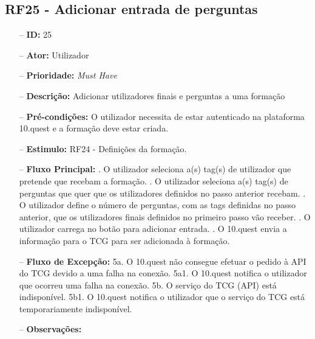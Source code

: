 \subsection{RF25 - Adicionar entrada de perguntas}
\begin{itemize}
	\item[--] \textbf{ID:} 25
	\item[--]  \textbf{Ator:} Utilizador
	\item[--]  \textbf{Prioridade:} \textit{Must Have}
	\item[--]  \textbf{Descrição:} Adicionar utilizadores finais e perguntas a uma formação
	\item[--]  \textbf{Pré-condições:} O utilizador necessita de estar autenticado na plataforma 10.quest e a formação deve estar criada.
	\item[--]  \textbf{Estimulo:} RF24 - Definições da formação.
	\item[--]  \textbf{Fluxo Principal:} 
		. O utilizador seleciona a(s) tag(s) de utilizador que pretende que recebam a formação.
		. O utilizador seleciona a(s) tag(s) de perguntas que quer que os utilizadores definidos no passo anterior recebam.
		. O utilizador define o número de perguntas, com as tags definidas no passo anterior, que os utilizadores finais definidos no primeiro passo vão receber.
		. O utilizador carrega no botão para adicionar entrada.
		. O 10.quest envia a informação para o TCG para ser adicionada à formação.
	\item[--]  \textbf{Fluxo de Excepção:} 
		\subitem 5a. O 10.quest não consegue efetuar o pedido à API do TCG devido a uma falha na conexão.
		\subitem 5a1. O 10.quest notifica o utilizador que ocorreu uma falha na conexão.
		\subitem 5b. O serviço do TCG (API) está indisponível.
		\subitem 5b1. O 10.quest notifica o utilizador que o serviço do TCG está temporariamente indisponível. 
	\item[--]  \textbf{Observações:} 
\end{itemize}
\newpage

